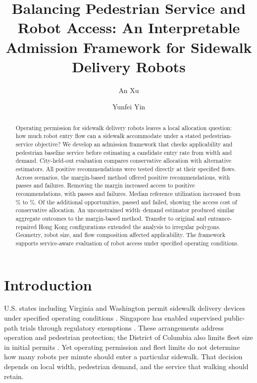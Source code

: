 \documentclass[NewProceedings,letterpaper]{ascelike-new}
\begin{document}
 
\title{Balancing Pedestrian Service and Robot Access: An Interpretable Admission Framework for Sidewalk Delivery Robots}
\author[1]{An Xu}
\author[1,*]{Yunfei Yin}
\maketitle
\begingroup
\renewcommand{\thefootnote}{*}
\endgroup
\begin{abstract}
Operating permission for sidewalk delivery robots leaves a local allocation question: how much robot entry flow can a sidewalk accommodate under a stated pedestrian-service objective? We develop an admission framework that checks applicability and pedestrian baseline service before estimating a candidate entry rate from width and demand. City-held-out evaluation compares conservative allocation with alternative estimators. All positive recommendations were tested directly at their specified flows. Across \EvalN{} scenarios, the margin-based method offered \MZeroPositive{} positive recommendations, with \MZeroPass{} passes and \MZeroFail{} failures. Removing the margin increased access to \MOnePositive{} positive recommendations, with \MOnePass{} passes and \MOneFail{} failures. Median reference utilization increased from \MZeroUtil{}\% to \MOneUtil{}\%. Of the \MZeroMOnePositive{} additional opportunities, \WithdrawnPass{} passed and \WithdrawnFail{} failed, showing the access cost of conservative allocation. An unconstrained width--demand estimator produced similar aggregate outcomes to the margin-based method. Transfer to \HKOriginalN{} original and \HKRepairedN{} entrance-repaired Hong Kong configurations extended the analysis to irregular polygons. Geometry, robot size, and flow composition affected applicability. The framework supports service-aware evaluation of robot access under specified operating conditions.
\end{abstract}

\section{Introduction}
U.S. states including Virginia and Washington permit sidewalk delivery devices under specified operating conditions \cite{VirginiaPDD,WashingtonPDD}. Singapore has enabled supervised public-path trials through regulatory exemptions \cite{LTAExemptions,IMDAPunggol}. These arrangements address operation and pedestrian protection; the District of Columbia also limits fleet size in initial permits \cite{DDOTPDD}. Yet operating permission and fleet limits do not determine how many robots per minute should enter a particular sidewalk. That decision depends on local width, pedestrian demand, and the service that walking should retain.
\end{document}
